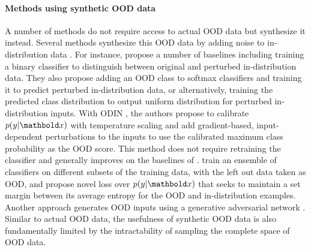 \paragraph{Methods using synthetic OOD data}
A number of methods do not require access to actual OOD data but synthesize it instead. 
Several methods synthesize this OOD data by adding noise to in-distribution data \cite{liang_enhancing_2018, lee_simple_2018, ren_likelihood_2019}. 
For instance, \textcite{ren_likelihood_2019} propose a number of baselines including training a binary classifier to distinguish between original and perturbed in-distribution data. They also propose adding an OOD class to softmax classifiers and training it to predict perturbed in-distribution data, or alternatively, training the predicted class distribution to output uniform distribution for perturbed in-distribution inputs. 
With ODIN \cite{liang_enhancing_2018}, the authors propose to calibrate $p(y|\xb)$ with temperature scaling \cite{guo_calibration_2017} and add gradient-based, input-dependent perturbations to the inputs to use the calibrated maximum class probability as the OOD score. This method does not require retraining the classifier and generally improves on the baselines of \textcite{ren_likelihood_2019}. 
\textcite{vyas_outofdistribution_2018} train an ensemble of classifiers on different subsets of the training data, with the left out data taken as OOD, and propose novel loss over $p(y|\xb)$ that seeks to maintain a set margin between its average entropy for the OOD and in-distribution examples. 
Another approach generates OOD inputs using a generative adversarial network \cite{lee_training_2018}. 
Similar to actual OOD data, the usefulness of synthetic OOD data is also fundamentally limited by the intractability of sampling the complete space of OOD data.

